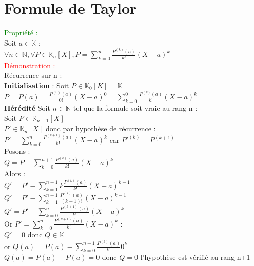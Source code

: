 \documentclass{article}
\begin{document}
\section{Formule de Taylor}
\textcolor{green}{Propriété :} \\
Soit $a \in \mathbb K$ : \\
$\forall n \in \mathbb N, \forall P \in \mathbb K_n[X],P= \sum_{k=0}^n \frac{P^{(k)}(a)}{k!}(X-a)^k$  \\
\textcolor{red}{Démonstration :} \\
Récurrence sur n : \\
{\bf Initialisation} : Soit $P \in \mathbb K_0 [K]=\mathbb K$ \\
$P=P(a)=\frac{P^{(0)}(a)}{0!}(X-a)^0= \sum_{k=0}^0\frac{P^{(k)}(a)}{k!}(X-a)^k $ \\
{\bf Hérédité} Soit $n \in \mathbb N$ tel que la formule soit vraie au rang n  : \\
Soit $P \in \mathbb K_{n+1}[X]$ \\
$P' \in \mathbb K_n[X]$ donc par hypothèse de récurrence : \\
$P'=\sum_{k=0}^n \frac{P^{(k+1)}(a)}{k!}(X-a)^k$ car $P'^{(k)}=P^{(k+1)}$ \\
Posons : \\
$Q=P- \sum_{k=0}^{n+1}\frac{P^{(k)}(a)}{k!}(X-a)^k$ \\
Alors : \\
$Q'=P'-\sum_{k=1}^{n+1} k\frac{P^{(k)}(a)}{k!}(X-a)^{k-1} $ \\
$Q'=P'-\sum_{k=1}^{n+1} \frac{P^{(k)}(a)}{(k-1)!}(X-a)^{k-1} $ \\
$Q'=P'- \sum_{k=0}^n \frac{P^{(k+1)}(a)}{k!}(X-a)^k$ \\
Or $P'=\sum_{k=0}^n \frac{P^{(k+1)}(a)}{k!}(X-a)^k$ : \\
$Q'=0$ donc $Q \in \mathbb K$ \\
or $Q(a)= P(a)-\sum_{k=0}^{n+1} \frac{P^{(k)}(a)}{k!}0^k$ \\
$Q(a)=P(a)-P(a)=0$ donc $Q=0$ l'hypothèse est vérifié au rang n+1
\end{document}
